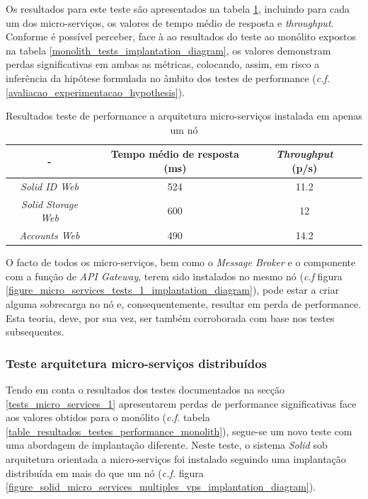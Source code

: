 Os resultados para este teste são apresentados na tabela \ref{r_t_m_s_1}, incluindo para cada um dos micro-serviços, os valores de tempo médio de resposta e \emph{throughput}.
Conforme é possível perceber, face à ao resultados do teste ao monólito expostos na tabela \ref{monolith_tests_implantation_diagram}, os valores demonstram perdas significativas em ambas as métricas, colocando, assim, em risco a inferência da hipótese formulada no âmbito dos testes de performance (\emph{c.f.} \ref{avaliacao_experimentacao_hypothesis}).

\begin{table}[h]
\centering
\caption{Resultados teste de performance a arquitetura micro-serviços instalada em apenas um nó}
\label{r_t_m_s_1}
\vspace{0.5cm}
\begin{tabular}{c|c|c|c} 
 - & Tempo médio de resposta (ms) & \emph{Throughput} (p/s) \\
\hline                          
\emph{Solid ID Web} & 524 & 11.2 \\
\emph{Solid Storage Web} & 600 & 12 \\
 \emph{Accounts Web} & 490 & 14.2 \\
\end{tabular}
\end{table}

O facto de todos os micro-serviços, bem como o \emph{Message Broker} e o componente com a função de \emph{API Gateway}, terem sido instalados no mesmo nó (\emph{c.f} figura \ref{figure_micro_services_tests_1_implantation_diagram}), pode estar a criar alguma sobrecarga no nó e, consequentemente, resultar em perda de performance. Esta teoria, deve, por sua vez, ser também corroborada com base nos testes subsequentes.

\subsubsection{Teste arquitetura micro-serviços distribuídos \label{tests_micro_services_2}}

Tendo em conta o resultados dos testes documentados na secção \ref{tests_micro_services_1} apresentarem perdas de performance significativas face aos valores obtidos para o monólito (\emph{c.f.} tabela \ref{table_resultados_testes_performance_monolith}), segue-se um novo teste com uma abordagem de implantação diferente.
Neste teste, o sistema \emph{Solid} sob arquitetura orientada a micro-serviços foi instalado seguindo uma implantação distribuída em mais do que um nó (\emph{c.f.} figura \ref{figure_solid_micro_services_multiples_vps_implantation_diagram}).

